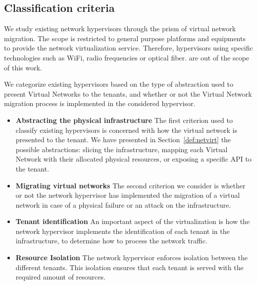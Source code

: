 \subsection{Classification criteria}
We study existing network hypervisors through the prism of virtual network migration.
The scope is restricted to general purpose platforms and equipments to provide the network virtualization service. Therefore, hypervisors using specific technologies such as WiFi, radio frequencies or optical fiber. are out of the scope of this work.

We categorize existing hypervisors based on the type of abstraction used to present Virtual Networks to the tenants, and whether or not the Virtual Network migration process is implemented in the considered hypervisor.

\begin{itemize}
\item \textbf{Abstracting the physical infrastructure}
The first criterion used to classify existing hypervisors is concerned with how the virtual network is presented to the tenant. We have presented in Section~\ref{def:netvirt} the possible abstractions: slicing the infrastructure, mapping each Virtual Network with their allocated physical resources, or exposing a specific API to the tenant.

\item \textbf{Migrating virtual networks}
The second criterion we consider is whether or not the network hypervisor has implemented the migration of a virtual network in case of a physical failure or an attack on the infrastructure.

\item \textbf{Tenant identification}
An important aspect of the virtualization is how the network hypervisor implements the identification of each tenant in the infrastructure, to determine how to process the network traffic.

\item \textbf{Resource Isolation}
The network hypervisor enforces isolation between the different tenants.
This isolation ensures that each tenant is served with the required amount of resources.
\end{itemize}
